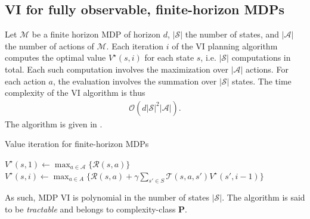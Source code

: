 \subsection{VI for fully observable, finite-horizon MDPs}
Let $\mathcal{M}$ be a finite horizon MDP of horizon $d$, $|\mathcal{S}|$ the number of states, and $|\mathcal{A}|$ the number of actions of $\mathcal{M}$. Each iteration $i$ of the VI planning algorithm computes the optimal value $V^{\star}(s,i)$ for each state $s$, i.e. $|\mathcal{S}|$ computations in total. Each such computation involves the maximization over $|\mathcal{A}|$ actions. For each action $a$, the evaluation involves the summation over $|\mathcal{S}|$ states. The time complexity of the VI algorithm is thus \cite{mdpcomp}
\begin{align}
    \mathcal{O}(d |\mathcal{S}|^2|\mathcal{A}|).
\end{align}
The algorithm is given in .

\begin{algorithm}[H]
\caption{Value iteration for finite-horizon MDPs}\label{alg:valitmdp}
\begin{algorithmic}[1]
    
         \State $V^{\star}(s, 1) \leftarrow \max_{a \in \mathcal{A}} \Big\{ \mathcal{R}(s,a) \Big\}$
         \Else \State $V^{\star}(s, i) \leftarrow \max_{a \in A} \Big\{ \mathcal{R}(s,a) + \gamma \sum_{s' \in S} \mathcal{T}(s,a,s') V^{\star}(s', i-1) \Big\}$
        \EndIf
    \EndFor
\EndFor

\EndProcedure
\end{algorithmic}
\end{algorithm}
As such, MDP VI is polynomial in the number of states $|\mathcal{S}|$. The algorithm is said to be \textit{tractable} and belongs to complexity-class \textbf{P}.
